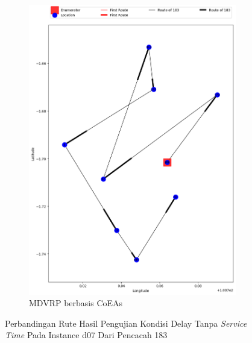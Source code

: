\begin{figure}[H]
	\centering
	\begin{subfigure}[t]{\textwidth}
		\centering
		\includegraphics[width=\textwidth]{Resources/Images/delayed_7/real_m15_n100_delayed_7_183_coes}
		\caption{MDVRP berbasis CoEAs}
		\label{fig:real_m15_n100_delayed_7_183_coes}
	\end{subfigure}
	\caption{Perbandingan Rute Hasil Pengujian Kondisi Delay Tanpa \textit{Service Time} Pada Instance d07 Dari Pencacah 183}
	\label{fig:real_m15_n100_delayed_7_183}
\end{figure}


